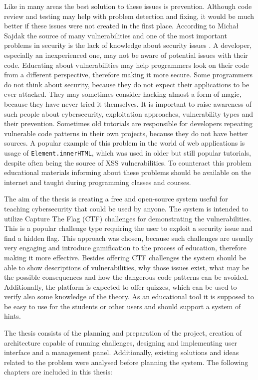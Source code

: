 Like in many areas the best solution to these issues is prevention. Although code review and testing may help with problem detection and fixing, it would be much better if these issues were not created in the first place. According to Michał Sajdak the source of many vulnerabilities and one of the most important problems in security is the lack of knowledge about security issues \cite{bib:securitum-wstep}. A developer, especially an inexperienced one, may not be aware of potential issues with their code. Educating about vulnerabilities may help programmers look on their code from a different perspective, therefore making it more secure. Some programmers do not think about security, because they do not expect their applications to be ever attacked. They may sometimes consider hacking almost a form of magic, because they have never tried it themselves. It is important to raise awareness of such people about cybersecurity, exploitation approaches, vulnerability types and their prevention. Sometimes old tutorials are responsible for developers repeating vulnerable code patterns in their own projects, because they do not have better sources. A popular example of this problem in the world of web applications is usage of \texttt{Element.innerHTML}, which was used in older but still popular tutorials, despite often being the source of XSS vulnerabilities. To counteract this problem educational materials informing about these problems should be available on the internet and taught during programming classes and courses.

The aim of the thesis is creating a free and open-source system useful for teaching cybersecurity that could be used by anyone. The system is intended to utilize Capture The Flag (CTF) challenges for demonstrating the vulnerabilities. This is a popular challenge type requiring the user to exploit a security issue and find a hidden flag. This approach was chosen, because such challenges are usually very engaging and introduce gamification to the process of education, therefore making it more effective. Besides offering CTF challenges the system should be able to show descriptions of vulnerabilities, why those issues exist, what may be the possible consequences and how the dangerous code patterns can be avoided. Additionally, the platform is expected to offer quizzes, which can be used to verify also some knowledge of the theory. As an educational tool it is supposed to be easy to use for the students or other users and should support a system of hints.

The thesis consists of the planning and preparation of the project, creation of architecture capable of running challenges, designing and implementing user interface and a management panel. Additionally, existing solutions and ideas related to the problem were analysed before planning the system. The following chapters are included in this thesis:

